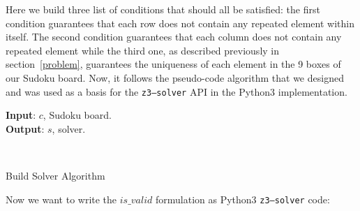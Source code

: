 \documentclass[]{usiinfprospectus}
\newcounter{row}
\newcounter{col}
\begin{document}
\noindent
Here we build three list of conditions that should all be satisfied: the first condition guarantees that each row does not contain any repeated element within itself. The second condition guarantees that each column does not contain any repeated element while the third one, as described previously
in section~\ref{problem}, guarantees the uniqueness of each element in the 9 boxes of our Sudoku board. Now, it follows the pseudo-code algorithm that we designed and was used as a basis for the \texttt{z3–solver} API in the Python3 implementation.
\begin{algorithm}[H]
\hspace*{\algorithmicindent} \textbf{Input}: $c$, Sudoku board. \\
\hspace*{\algorithmicindent} \textbf{Output}: $s$, solver.
\begin{algorithmic}[1]\label{algorithm:}
 
\EndFor
{} 
\EndFor
{} 
\EndFor
\EndFor
{}
\\
\EndFunction
\end{algorithmic}
\caption {Build Solver Algorithm}
\end{algorithm}

\newpage
\noindent
Now we want to write the $ is\_valid $ formulation as Python3 \texttt{z3–solver}
code:
\end{document}
